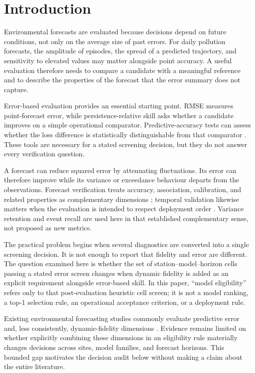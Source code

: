 \section{Introduction}
\label{sec:introduction}

Environmental forecasts are evaluated because decisions depend on future
conditions, not only on the average size of past errors. For daily
pollution forecasts, the amplitude of episodes, the spread of a predicted
trajectory, and sensitivity to elevated values may matter alongside point
accuracy. A useful evaluation therefore needs to compare a candidate with
a meaningful reference and to describe the properties of the forecast that
the error summary does not capture.

Error-based evaluation provides an essential starting point. RMSE measures
point-forecast error, while persistence-relative skill asks whether a
candidate improves on a simple operational comparator. Predictive-accuracy
tests can assess whether the loss difference is statistically
distinguishable from that comparator \cite{hyndman2006,diebold1995,harvey1997}.
These tools are necessary for a stated screening decision, but they do not
answer every verification question.

A forecast can reduce squared error by attenuating fluctuations. Its error
can therefore improve while its variance or exceedance behaviour departs
from the observations. Forecast verification treats accuracy, association,
calibration, and related properties as complementary dimensions
\cite{gneiting2011,jolliffe2012}; temporal validation likewise matters when
the evaluation is intended to respect deployment order
\cite{tashman2000,bergmeir2018}. Variance retention and event recall are
used here in that established complementary sense, not proposed as new
metrics.

The practical problem begins when several diagnostics are converted into a
single screening decision. It is not enough to report that fidelity and error
are different. The question examined here is whether the set of
station--model--horizon cells passing a stated error screen changes when
dynamic fidelity is added as an explicit requirement alongside error-based
skill. In this paper, ``model eligibility'' refers only to that
post-evaluation heuristic cell screen; it is not a model ranking, a top-1
selection rule, an operational acceptance criterion, or a deployment rule.

Existing environmental forecasting studies commonly evaluate predictive
error and, less consistently, dynamic-fidelity dimensions
\cite{mendez2023,tang2024,chadalavada2025}. Evidence remains limited on
whether explicitly combining these dimensions in an eligibility rule
materially changes decisions across sites, model families, and forecast
horizons. This bounded gap motivates the decision audit below without making
a claim about the entire literature.

